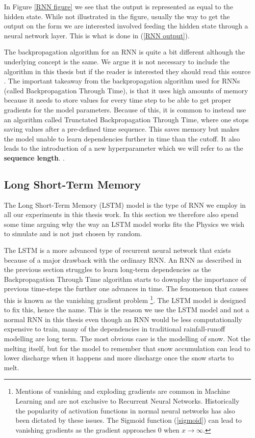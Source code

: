 In Figure \ref{RNN figure} we see that the output is represented as equal to the 
hidden state. While not illustrated in the figure, usually the way to get the output 
on the form we are interested involved feeding the hidden state through a neural 
network layer. This is what is done in (\ref{RNN output}).

The backpropagation algorithm for an RNN is quite a bit different although the 
underlying concept is the same. We argue it is not necessary to include the algorithm 
in this thesis but if the reader is interested they should read this source \cite{BPTT}.
The important takeaway from the backpropagation algorithm used for RNNs (called 
Backpropagation Through Time), is that it uses high amounts of memory because 
it needs to store values for every time step to be able to get proper gradients 
for the model parameters. Because of this, it is common to instead use an algorithm 
called Trunctated Backpropagation Through Time, where one stops saving values after 
a pre-defined time sequence. This saves memory but makes the model unable to learn 
dependencies further in time than the cutoff. It also leads to the introduction of 
a new hyperparameter which we will refer to as the \textbf{sequence length}. \citationneeded.

\subsection{Long Short-Term Memory}
\label{LSTM Theory}
The Long Short-Term Memory (LSTM) model is the type of RNN we employ in all our 
experiments in this thesis work. In this section we therefore also spend some 
time arguing why the way an LSTM model works fits the Physics we wish to simulate 
and is not just chosen by random. 

The LSTM is a more advanced type of recurrent neural network that exists because 
of a major drawback with the ordinary RNN. An RNN as described in the previous section 
struggles to learn long-term dependencies as the Backpropagation Through Time 
algorithm starts to downplay the importance of previous time-steps the further one 
advances in time. The fenomenon that causes this is known as the vanishing gradient 
problem \cite{bengio1994learning} \cite{graves2012long} \footnote{Mentions of 
vanishing and exploding gradients are common in Machine Learning and are not 
exclusive to Recurrent Neural Networks. Historically the popularity of activation 
functions in normal neural networks has also been dictated by these issues. The 
Sigmoid function (\ref{sigmoid}) can lead to vanishing gradients as the gradient 
approaches $0$ when $x\rightarrow \infty$.}.
The LSTM model is designed to fix this, 
hence the name. This is the reason we use the LSTM model and not a normal RNN in 
this thesis even though an RNN would be less computationally expensive to train, 
many of the dependencies in traditional rainfall-runoff modelling are long term. 
The most obvious case is the modelling of snow. Not the melting itself, but for 
the model to remember that snow accumulation can lead to lower discharge when it 
happens and more discharge once the snow starts to melt.

